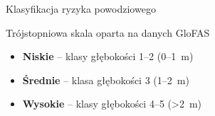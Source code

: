\documentclass[aspectratio=169]{beamer}
\begin{document}
\begin{frame}{Klasyfikacja ryzyka powodziowego}
\begin{center}
\begin{block}{Trójstopniowa skala oparta na danych GloFAS}
\vspace{0.3cm}
\begin{itemize}
    \item \textbf{Niskie} -- klasy głębokości 1--2 (0--1~m)
    \vspace{0.3cm}
    \item \textbf{Średnie} -- klasa głębokości 3 (1--2~m)
    \vspace{0.3cm}
    \item \textbf{Wysokie} -- klasy głębokości 4--5 (>2~m)
\end{itemize}
\vspace{0.3cm}
\end{block}
\end{center}
\end{frame}
\end{document}
